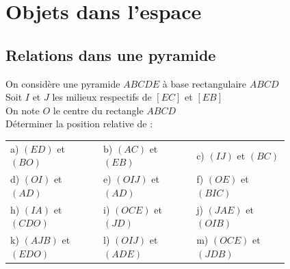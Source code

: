 \documentclass[oneside,12pt]{article}          %
\begin{document}
\section{Objets dans l'espace}

\subsection{Relations dans une pyramide}

\begin{minipage}{0.5\textwidth}
    On considère une pyramide $ABCDE$ à base rectangulaire $ABCD$\\
    Soit $I$ et $J$ les milieux respectifs de $[EC]$ et $[EB]$\\
    On note $O$ le centre du rectangle $ABCD$\\
    Déterminer la position relative de :
\end{minipage}
\hfill
\begin{minipage}{0.45\textwidth}
\end{minipage}

\renewcommand{\arraystretch}{1.5}
\begin{tabular}{p{0.27\linewidth}p{0.27\linewidth}p{0.27\linewidth}}
	a) $(ED)$ et $(BO)$ & b) $(AC)$ et $(EB)$ & c) $(IJ)$ et $(BC)$\\
	d) $(OI)$ et $(AD)$ & e) $(OIJ)$ et $(AD)$ & f) $(OE)$ et $(BIC)$ \\
	h) $(IA)$ et $(CDO)$ & i) $(OCE)$ et $(JD)$ & j) $(JAE)$ et $(OIB)$\\
	k) $(AJB)$ et $(EDO)$ & l) $(OIJ)$ et $(ADE)$ & m) $(OCE)$ et $(JDB)$
\end{tabular}
\end{document}
